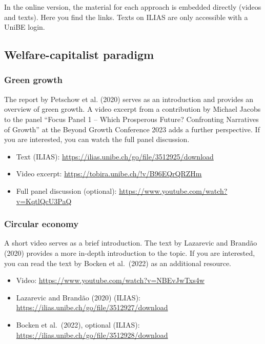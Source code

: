 \documentclass[
  british,
  a4paper,
  DIV=11,
  numbers=noendperiod,
  oneside,
  openany]{scrreprt}
\providecommand{\tightlist}{%
  \setlength{\itemsep}{0pt}\setlength{\parskip}{0pt}}
\begin{document}
In the online version, the material for each approach is embedded
directly (videos and texts). Here you find the links. Texts on ILIAS are
only accessible with a UniBE login.

\subsection{Welfare-capitalist
paradigm}\label{welfare-capitalist-paradigm-1}

\subsubsection{Green growth}\label{green-growth-1}

The report by Petschow et al. (2020) serves as an introduction and
provides an overview of green growth. A video excerpt from a
contribution by Michael Jacobs to the panel ``Focus Panel 1 -- Which
Prosperous Future? Confronting Narratives of Growth'' at the Beyond
Growth Conference 2023 adds a further perspective. If you are
interested, you can watch the full panel discussion.

\begin{itemize}
\tightlist
\item
  Text (ILIAS): \url{https://ilias.unibe.ch/go/file/3512925/download}
\item
  Video excerpt: \url{https://tobira.unibe.ch/!v/B96EQrQRZHm}
\item
  Full panel discussion (optional):
  \url{https://www.youtube.com/watch?v=KqtlQcU3PaQ}
\end{itemize}

\subsubsection{Circular economy}\label{circular-economy-1}

A short video serves as a brief introduction. The text by Lazarevic and
Brandão (2020) provides a more in-depth introduction to the topic. If
you are interested, you can read the text by Bocken et al.~(2022) as an
additional resource.

\begin{itemize}
\tightlist
\item
  Video: \url{https://www.youtube.com/watch?v=NBEvJwTxs4w}
\item
  Lazarevic and Brandão (2020) (ILIAS):
  \url{https://ilias.unibe.ch/go/file/3512927/download}
\item
  Bocken et al.~(2022), optional (ILIAS):
  \url{https://ilias.unibe.ch/go/file/3512928/download}
\end{itemize}
\end{document}

